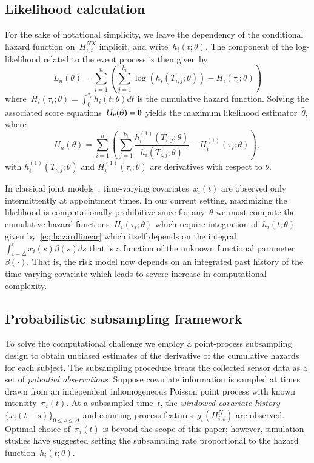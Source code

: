 \documentclass[12pt]{amsart}
\begin{document}
\subsection{Likelihood calculation}

For the sake of notational simplicity, we leave the dependency of the conditional hazard function on~$H_{i,t}^{NX}$ implicit, and write~$h_i (t; \theta)$. The component of the log-likelihood related to the event process is then given by
\[
  L_n (\theta) = \sum_{i=1}^{n} \left ( \sum_{j=1}^{k_i}
    \log \left( h_i \left( T_{i,j}; \theta
      \right) \right) - H_{i} \left( \tau_i; \theta \right) \right)
\]
where~$H_{i} (\tau_i ; \theta) = \int_{0}^{\tau_i} h_{i} (t; \theta) dt$ is the cumulative hazard function. Solving the associated score equations~$U_n (\theta) = {\bf 0}$ yields the maximum likelihood estimator~$\hat \theta$, where
\[
U_n (\theta) = \sum_{i=1}^{n} \left ( \sum_{j=1}^{k_i} \frac{h^{(1)}_i
    (T_{i,j}; \theta)}{h_i (T_{i,j}; \theta)} - H^{(1)}_{i} (\tau_i;
  \theta) \right),
\]
with $h_i^{(1)} (T_{i,j}; \theta)$ and $H_i^{(1)} (\tau_{i}; \theta)$ are derivatives with respect to $\theta$.

In classical joint models~\citep{Henderson2000, Tsiatis2004}, time-varying covariates~$x_i (t)$ are observed only intermittently at appointment times. In our current setting, maximizing the likelihood is computationally prohibitive since for any~$\theta$ we must compute the cumulative hazard functions~$H_{i} (\tau_i; \theta)$ which require integration of~$h_i(t;\theta)$ given by~\eqref{eq:hazardlinear} which itself depends on the integral~$\int_{t-\Delta}^t x_i (s) \beta(s) ds$ that is a function of the unknown functional parameter $\beta(\cdot)$.  That is, the risk model now depends on an integrated past history of the time-varying covariate which leads to severe increase in computational complexity.

\subsection{Probabilistic subsampling framework}

To solve the computational challenge we employ a point-process subsampling design to obtain unbiased estimates of the derivative of the cumulative hazards for each subject. The subsampling procedure treats the collected sensor data as a set of \emph{potential observations}. Suppose covariate information is sampled at times drawn from an independent inhomogeneous Poisson point process with known intensity~$\pi_i (t)$. At a subsampled time~$t$, the \emph{windowed covariate history} $\{ x_i (t-s)\}_{0 \leq s \leq \Delta}$ and counting process features~$g_t (H_{i,t}^N)$ are observed. Optimal choice of~$\pi_i (t)$ is beyond the scope of this paper; however, simulation studies have suggested setting the subsampling rate proportional to the hazard function~$h_i (t; \theta)$.
\end{document}
